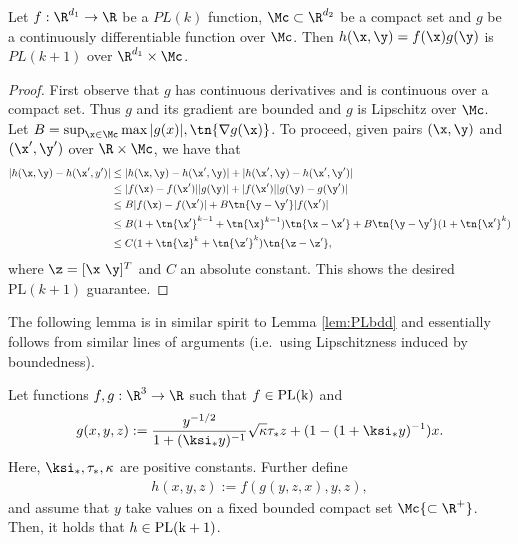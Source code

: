 {
\begin{lemma}\label{lem:PLbdd}%
Let $f:\R^{d_1}\rightarrow \R$ be a $PL(k)$ function, $\Mc\subset \R^{d_2}$ be a compact set and $g$ be a continuously differentiable function over $\Mc$. Then $h(\x,\y)=f(\x)g(\y)$ is $PL(k+1)$ over $\R^{d_1}\times \Mc$.
\end{lemma}
\begin{proof} First observe that $g$ has continuous derivatives and is continuous over a compact set. Thus $g$ and its gradient are bounded and $g$ is Lipschitz over $\Mc$. Let $B=\sup_{\x\in \Mc}\max |g(x)|,\tn{\nabla g(\x)}$. To proceed, given pairs $(\x,\y)$ and $(\x',\y')$ over $\R\times \Mc$, we have that
\begin{align}
|h(\x,\y)-h(\x',y')|&\leq |h(\x,\y)-h(\x',\y)|+ |h(\x',\y)-h(\x',\y')|\\
&\leq |f(\x)-f(\x')||g(\y)|+ |f(\x')||g(\y)-g(\y')|\\
&\leq B|f(\x)-f(\x')|+ B\tn{\y-\y'}|f(\x')|\\
&\leq B(1+\tn{\x'}^{k-1}+\tn{\x}^{k-1})\tn{\x-\x'}+ B\tn{\y-\y'}(1+\tn{\x'}^k)\\
&\leq C (1+\tn{\z}^k+\tn{\z'}^{k})\tn{\z-\z'},
\end{align}
where $\z=[\x~\y]^T$ and $C$ an absolute constant. This shows the desired $\text{PL}(k+1)$ guarantee.
\end{proof}
The following lemma is in similar spirit to Lemma \ref{lem:PLbdd} and essentially follows from similar lines of arguments (i.e.~using Lipschitzness induced by boundedness).
}
\begin{lemma}\label{lem:hPL}
Let functions $f,g:\R^3\rightarrow\R$ such that $f\in\rm{PL}(k)$ and 
$$
g(x,y,z) := \frac{y^{-1/2}}{1+(\ksi_* y)^{-1}}\sqrt{\kappa}\tau_* z + (1-(1+\ksi_*y)^{-1})x.
$$
Here, $\ksi_*,\tau_*,\kappa$ are positive constants. 
Further define 
\begin{align}
h(x,y,z) := f\left(g(y,z,x),y,z\right),
\end{align}
and assume that $y$ take values on a fixed bounded compact set $\Mc{\subset\R^+}$.
Then, it holds that $h\in\rm{PL}(k+1)$.
\end{lemma}

